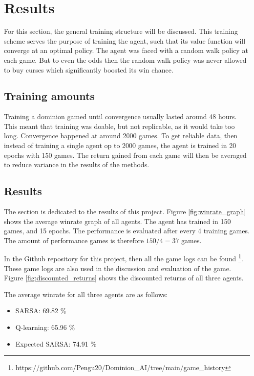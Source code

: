 \chapter{Results} \label{ch:results}
For this section, the general training structure will be discussed. This training scheme serves the purpose of training the agent, such that its value function will converge at an optimal policy. The agent was faced with a random walk policy at each game. But to even the odds then the random walk policy was never allowed to buy curses which significantly boosted its win chance. 



\section{Training amounts}
Training a dominion gamed until convergence usually lasted around 48 hours. This meant that training was doable, but not replicable, as it would take too long. Convergence happened at around 2000 games. To get reliable data, then instead of training a single agent op to 2000 games, the agent is trained in 20 epochs with 150 games. The return gained from each game will then be averaged to reduce variance in the results of the methods.
\section{Results}
The section is dedicated to the results of this project. Figure \ref{fig:winrate_graph} shows the average winrate graph of all agents. The agent has trained in 150 games, and 15 epochs. The performance is evaluated after every 4 training games. The amount of performance games is therefore $150/4 = 37$ games.

In the Github repository for this project, then all the game logs can be found \footnote{https://github.com/Pengu20/Dominion\_AI/tree/main/game\_history}. These game logs are also used in the discussion and evaluation of the game.
Figure \ref{fig:discounted_returns} shows the discounted returns of all three agents.

The average winrate for all three agents are as follows:
\begin{itemize}
    \item SARSA: 69.82 \%
    \item Q-learning: 65.96 \%
    \item Expected SARSA: 74.91 \%
\end{itemize}

